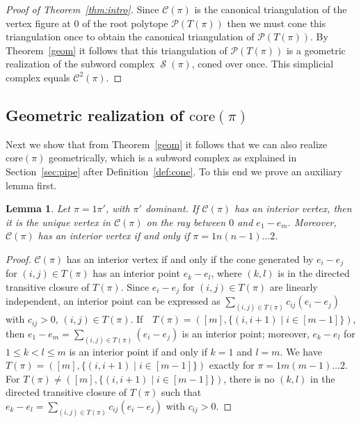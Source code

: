 \documentclass[10pt]{amsart}
\newtheorem{lemm}[theo]{Lemma}
\theoremstyle{definition}
\numberwithin{equation}{section}
\newcommand*\C{{\mathcal{C}}}
\renewcommand*\P{{\mathcal{P}}}
\newcommand*\+{\smash{\lower2pt\hbox{\rlap{\vrule height14pt}}\raise2pt\hbox{\rlap{\hskip-3pt \vrule height.4pt depth0pt width14.7pt}}}}
\DeclareMathOperator{\Scal}{\mathcal{S}}
\begin{document}
\begin{proof}[Proof of Theorem~\ref{thm:intro}]
Since $\C(\pi)$ is the canonical triangulation of the vertex figure at $0$ of the root polytope $\P(T(\pi))$ then we must cone this triangulation once to obtain the canonical triangulation of $\P(T(\pi))$. By Theorem~\ref{geom} it follows that this triangulation of $\P(T(\pi))$ is a geometric realization of the subword complex $\Scal(\pi)$, coned over once. This simplicial complex equals $\mathcal{C}^2(\pi)$.
\end{proof}


\subsection{Geometric realization of \texorpdfstring{$\text{core}(\pi)$}{core(pi)}}

Next we show that from Theorem~\ref{geom} it follows that we can also realize $\text{core}(\pi)$ geometrically, which is a subword complex as explained in Section~\ref{sec:pipe} after Definition~\ref{def:cone}. To this end we prove an auxiliary lemma first.

\begin{lemm}\label{int}
Let $\pi=1\pi'$, with $\pi'$ dominant. If $\C(\pi)$ has an interior vertex, then it is the unique vertex in $\C(\pi)$ on the ray between $0$ and $e_1-e_m$. Moreover, $\C(\pi)$ has an interior vertex if and only if $\pi=1n(n-1)\dots 2$.
\end{lemm}

\begin{proof} $\C(\pi)$ has an interior vertex if and only if the cone generated by $e_i-e_j$ for $(i,j)\in T(\pi)$ has an interior point $e_k-e_l$, where $(k,l)$ is in the directed transitive closure of $T(\pi)$. Since $e_i-e_j$ for $(i,j)\in T(\pi)$ are linearly independent, an interior point can be expressed as $\sum_{(i,j)\in T(\pi)} c_{ij} (e_i-e_j)$ with $c_{ij}>0$, $(i,j)\in T(\pi)$. If $\mbox{ } T(\pi)=([m], \{(i,i+1) \mid i \in [m-1]\})$, then $e_1-e_m=\sum_{(i,j)\in T(\pi)} (e_i-e_j)$ is an interior point; moreover, $e_k-e_l$ for $1\leq k<l\leq m$ is an interior point if and only if $k=1$ and $l=m$. We have $T(\pi)=([m], \{(i,i+1) \mid i \in [m-1]\})$ exactly for $\pi=1 m (m-1)\dots 2$. For $T(\pi)\neq ([m], \{(i,i+1) \mid i \in [m-1]\})$, there is no $(k,l)$ in the directed transitive closure of $T(\pi)$ such that $e_k-e_l=\sum_{(i,j)\in T(\pi)} c_{ij} (e_i-e_j)$ with $c_{ij}>0$.
\end{proof}
\end{document}
